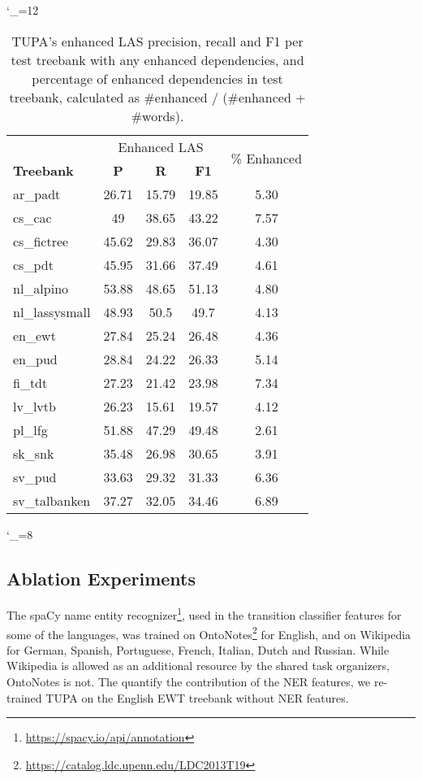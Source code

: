 \documentclass[11pt,a4paper]{article}
\begin{document}
\catcode`\_=12
\begin{table}[t]
\begin{tabular}{l|ccc|c}
\hline
& \multicolumn{3}{c|}{Enhanced LAS} & \multirow{2}{11mm}{\% Enhanced} \\
\bf Treebank & \bf P & \bf R & \bf F1 & \\
\hline
ar_padt & 26.71 & 15.79 & 19.85 & 5.30 \\
cs_cac & 49 & 38.65 & 43.22 & 7.57 \\
cs_fictree & 45.62 & 29.83 & 36.07 & 4.30 \\
cs_pdt & 45.95 & 31.66 & 37.49 & 4.61 \\
nl_alpino & 53.88 & 48.65 & 51.13 & 4.80 \\
nl_lassysmall & 48.93 & 50.5 & 49.7 & 4.13 \\
en_ewt & 27.84 & 25.24 & 26.48 & 4.36 \\
en_pud & 28.84 & 24.22 & 26.33 & 5.14 \\
fi_tdt & 27.23 & 21.42 & 23.98 & 7.34 \\
lv_lvtb & 26.23 & 15.61 & 19.57 & 4.12 \\
pl_lfg & 51.88 & 47.29 & 49.48 & 2.61 \\
sk_snk & 35.48 & 26.98 & 30.65 & 3.91 \\
sv_pud & 33.63 & 29.32 & 31.33 & 6.36 \\
sv_talbanken & 37.27 & 32.05 & 34.46 & 6.89
\end{tabular}
\caption{TUPA's enhanced LAS precision, recall and F1 per test treebank with 
any enhanced dependencies,
and percentage of enhanced dependencies in test treebank, calculated as
\#enhanced / (\#enhanced + \#words).
\label{tab:enhanced}}
\end{table}
\catcode`\_=8

\subsection{Ablation Experiments}\label{sec:ablation}

The spaCy name entity
recognizer\footnote{\url{https://spacy.io/api/annotation}}, 
used in the transition classifier features for some of the languages,
was trained on
OntoNotes\footnote{\url{https://catalog.ldc.upenn.edu/LDC2013T19}}
for English, and on Wikipedia \cite{nothman2013learning} for
German, Spanish, Portuguese, French, Italian, Dutch and Russian.
While Wikipedia is allowed as an additional resource by the shared task
organizers, OntoNotes is not.
The quantify the contribution of the NER features,
we re-trained TUPA on the English EWT treebank without NER features.
\end{document}
